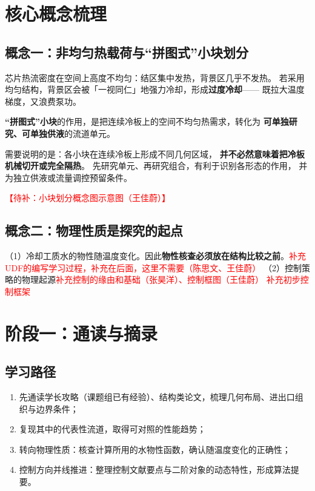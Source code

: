 \documentclass[stage1,fontset=fandol]{ydzjreport}
\begin{document}
	\section{核心概念梳理}
	
	\subsection{概念一：非均匀热载荷与“拼图式”小块划分}
	
	芯片热流密度在空间上高度不均匀：结区集中发热，背景区几乎不发热。
	若采用均匀结构，背景区会被「一视同仁」地强力冷却，形成\textbf{过度冷却}——
	既拉大温度梯度，又浪费泵功。
	
	\textbf{“拼图式”小块}的作用，是把连续冷板上的空间不均匀热需求，转化为
	\textbf{可单独研究、可单独供液}的流道单元。
	
	需要说明的是：各小块在连续冷板上形成不同几何区域，
	\textbf{并不必然意味着把冷板机械切开或完全隔热}。
	先研究单元、再研究组合，有利于识别各形态的作用，
	并为独立供液或流量调控预留条件。
	
	\textcolor{red}{【待补：小块划分概念图示意图（王佳蔚）】}
	
	\subsection{概念二：物理性质是探究的起点}
	
	（1）冷却工质水的物性随温度变化。因此\textbf{物性核查必须放在结构比较之前}。\textcolor{red}{补充UDF的编写学习过程，补充在后面，这里不需要（陈思文、王佳蔚）}
	（2）控制策略的物理起源\textcolor{red}{补充控制的缘由和基础（张昊洋）、控制框图（王佳蔚）}
	\textcolor{red}{补充初步控制框架}
	
	\section{阶段一：通读与摘录}
	
	\subsection{学习路径}
	
	\begin{enumerate}
		\item 先通读学长攻略（课题组已有经验）、结构类论文，梳理几何布局、进出口组织与边界条件；
		\item 复现其中的代表性流道，取得可对照的性能趋势；
		\item 转向物理性质：核查计算所用的水物性函数，确认随温度变化的正确性；
		\item 控制方向并线推进：整理控制文献要点与二阶对象的动态特性，形成算法提要。
	\end{enumerate}
	
\end{document}
